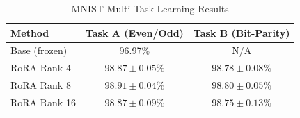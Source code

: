 \begin{table}[h]
\centering
\caption{MNIST Multi-Task Learning Results}
\label{tab:experiment1}
\begin{tabular}{lcc}
\toprule
Method & Task A (Even/Odd) & Task B (Bit-Parity) \\
\midrule
Base (frozen) & 96.97\% & N/A \\
RoRA Rank 4 & $98.87 \pm 0.05\%$ & $98.78 \pm 0.08\%$ \\
RoRA Rank 8 & $98.91 \pm 0.04\%$ & $98.80 \pm 0.05\%$ \\
RoRA Rank 16 & $98.87 \pm 0.09\%$ & $98.75 \pm 0.13\%$ \\
\bottomrule
\end{tabular}
\end{table}